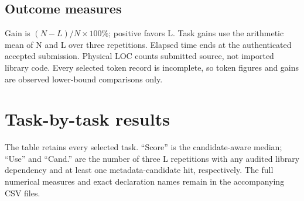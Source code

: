 \documentclass[10pt]{article}
\begin{document}
\subsection*{Outcome measures}

Gain is $(N-L)/N\times 100\%$; positive favors L. Task gains use the arithmetic mean of N and L over three repetitions. Elapsed time ends at the authenticated accepted submission. Physical LOC counts submitted source, not imported library code. Every selected token record is incomplete, so token figures and gains are observed lower-bound comparisons only.

\clearpage
\section{Task-by-task results}

The table retains every selected task. ``Score'' is the candidate-aware median; ``Use'' and ``Cand.'' are the number of three L repetitions with any audited library dependency and at least one metadata-candidate hit, respectively. The full numerical measures and exact declaration names remain in the accompanying CSV files.
\end{document}
